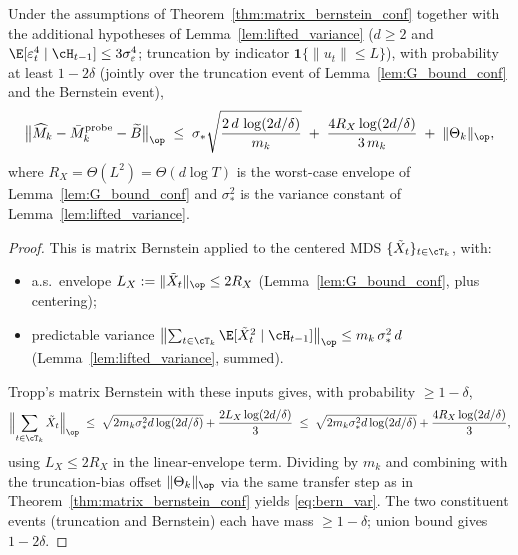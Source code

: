 \begin{theorem}
\label{thm:matrix_bernstein_var}
Under the assumptions of Theorem~\ref{thm:matrix_bernstein_conf}
together with the additional hypotheses of Lemma~\ref{lem:lifted_variance}
($d\ge 2$ and $\E[\varepsilon_t^4\mid\cH_{t-1}]\le 3\sigma_\varepsilon^4$;
truncation by indicator $\mathbf 1\{\|u_t\|\le L\}$), with
probability at least $1-2\delta$ (jointly over the truncation event of
Lemma~\ref{lem:G_bound_conf} and the Bernstein event),
\begin{equation}
\bigl\|\widehat M_k-\bar M_k^{\mathrm{probe}}-\widetilde B\bigr\|_\op
\;\le\;\sigma_*\sqrt{\frac{2\,d\,\log(2d/\delta)}{m_k}}
\;+\;\frac{4 R_X\log(2d/\delta)}{3\,m_k}
\;+\;\|\Theta_k\|_\op,
\label{eq:bern_var}
\end{equation}
where $R_X = \Theta(L^2)=\Theta(d\log T)$ is the worst-case envelope of
Lemma~\ref{lem:G_bound_conf} and $\sigma_*^2$ is the variance constant
of Lemma~\ref{lem:lifted_variance}.
\end{theorem}
\begin{proof}
This is matrix Bernstein \citep[Theorem~7.7.1]{tropp2015introduction}
applied to the centered MDS $\{\tilde X_t\}_{t\in\cT_k}$, with:
\begin{itemize}[leftmargin=1.5em,nosep]
\item a.s.\ envelope $L_X := \|\tilde X_t\|_\op\le 2R_X$ (Lemma~\ref{lem:G_bound_conf}, plus centering);
\item predictable variance
$\bigl\|\sum_{t\in\cT_k}\E[\tilde X_t^2\mid\cH_{t-1}]\bigr\|_\op\le m_k\,\sigma_*^2\,d$
(Lemma~\ref{lem:lifted_variance}, summed).
\end{itemize}
Tropp's matrix Bernstein with these inputs gives, with probability
$\ge 1-\delta$,
\[
\Bigl\|\sum_{t\in\cT_k}\tilde X_t\Bigr\|_\op
\;\le\;\sqrt{2 m_k\sigma_*^2 d\log(2d/\delta)} + \frac{2L_X\log(2d/\delta)}{3}
\;\le\;\sqrt{2 m_k\sigma_*^2 d\log(2d/\delta)} + \frac{4 R_X\log(2d/\delta)}{3},
\]
using $L_X\le 2R_X$ in the linear-envelope term. Dividing by $m_k$
and combining with the truncation-bias offset $\|\Theta_k\|_\op$ via
the same transfer step as in Theorem~\ref{thm:matrix_bernstein_conf}
yields \eqref{eq:bern_var}. The two constituent events (truncation
and Bernstein) each have mass $\ge 1-\delta$; union bound gives
$1-2\delta$.
\end{proof}

